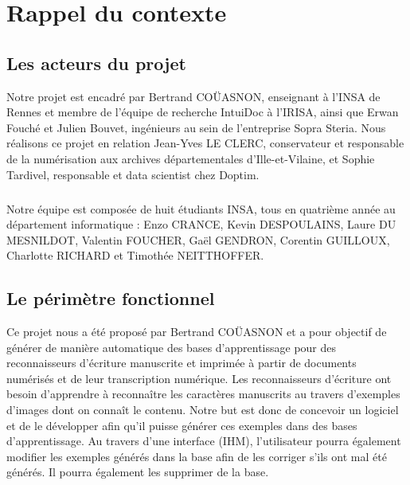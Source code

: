 
\chapter{Rappel du contexte}

\section{Les acteurs du projet}

Notre projet est encadré par Bertrand COÜASNON, enseignant à l’INSA de Rennes et membre de l’équipe de recherche IntuiDoc à l’IRISA, ainsi que Erwan Fouché et Julien Bouvet, ingénieurs au sein de l’entreprise Sopra Steria. Nous réalisons ce projet en relation Jean-Yves LE CLERC, conservateur et responsable de la numérisation  aux archives départementales d’Ille-et-Vilaine, et Sophie Tardivel, responsable et data scientist chez Doptim.

\paragraph{}

Notre équipe est composée de huit étudiants INSA, tous en quatrième année au département informatique : Enzo CRANCE, Kevin DESPOULAINS, Laure DU MESNILDOT, Valentin FOUCHER, Gaël GENDRON, Corentin GUILLOUX, Charlotte RICHARD et Timothée NEITTHOFFER.

\section{Le périmètre fonctionnel}

Ce projet nous a été proposé par Bertrand COÜASNON et a pour objectif de générer de manière automatique des bases d’apprentissage pour des reconnaisseurs d’écriture manuscrite et imprimée à partir de documents numérisés et de leur transcription numérique. Les reconnaisseurs d’écriture ont besoin d’apprendre à reconnaître les caractères manuscrits au travers d'exemples d'images dont on connaît le contenu. Notre but est donc de concevoir un logiciel et de le développer afin qu’il puisse générer ces exemples dans des bases d’apprentissage. Au travers d’une interface (IHM), l’utilisateur pourra également modifier les exemples générés dans la base afin de les corriger s’ils ont mal été générés. Il pourra également les supprimer de la base.

\paragraph{}

